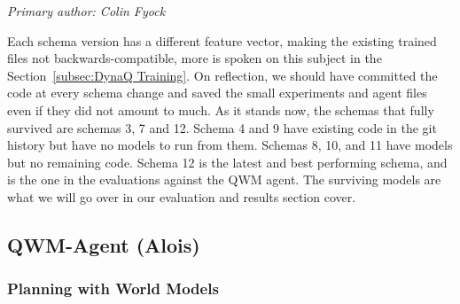 \documentclass[article, 10pt]{IEEEtran}
\begin{document}
\textit{Primary author: Colin Fyock}

Each schema version has a different feature vector, making the existing trained files not backwards-compatible, more is spoken on this subject in the Section~\ref{subsec:DynaQ Training}. On reflection, we should have committed the code at every schema change and saved the small experiments and agent files even if they did not amount to much. As it stands now, the schemas that fully survived are schemas 3, 7 and 12. Schema 4 and 9 have existing code in the git history but have no models to run from them. Schemas 8, 10, and 11 have models but no remaining code. Schema 12 is the latest and best performing schema, and is the one in the evaluations against the QWM agent. The surviving models are what we will go over in our evaluation and results section cover.


\subsection{QWM-Agent (Alois)}\label{sec:qwm_agent} %

\subsubsection{Planning with World Models}

    
\end{document}
